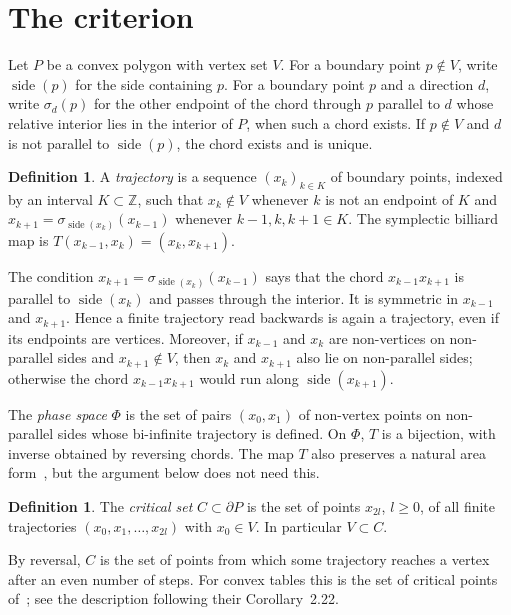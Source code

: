 \documentclass[11pt]{amsart}
\theoremstyle{definition}
\newtheorem{definition}[theorem]{Definition}
\theoremstyle{remark}
\newcommand{\Z}{\mathbb Z}
\newcommand{\side}{\operatorname{side}}
\begin{document}
\section{The criterion}\label{sec:criterion}

Let $P$ be a convex polygon with vertex set $V$. For a boundary point $p\notin V$, write $\side(p)$ for the side containing $p$. For a boundary point $p$ and a direction $d$, write $\sigma_d(p)$ for the other endpoint of the chord through $p$ parallel to $d$ whose relative interior lies in the interior of $P$, when such a chord exists. If $p\notin V$ and $d$ is not parallel to $\side(p)$, the chord exists and is unique.

\begin{definition}
A \emph{trajectory} is a sequence $(x_k)_{k\in K}$ of boundary points, indexed by an interval $K\subset\Z$, such that $x_k\notin V$ whenever $k$ is not an endpoint of $K$ and $x_{k+1}=\sigma_{\side(x_k)}(x_{k-1})$ whenever $k-1,k,k+1\in K$. The symplectic billiard map is $T(x_{k-1},x_k)=(x_k,x_{k+1})$.
\end{definition}

The condition $x_{k+1}=\sigma_{\side(x_k)}(x_{k-1})$ says that the chord $x_{k-1}x_{k+1}$ is parallel to $\side(x_k)$ and passes through the interior. It is symmetric in $x_{k-1}$ and $x_{k+1}$. Hence a finite trajectory read backwards is again a trajectory, even if its endpoints are vertices. Moreover, if $x_{k-1}$ and $x_k$ are non-vertices on non-parallel sides and $x_{k+1}\notin V$, then $x_k$ and $x_{k+1}$ also lie on non-parallel sides; otherwise the chord $x_{k-1}x_{k+1}$ would run along $\side(x_{k+1})$.

The \emph{phase space} $\Phi$ is the set of pairs $(x_0,x_1)$ of non-vertex points on non-parallel sides whose bi-infinite trajectory is defined. On $\Phi$, $T$ is a bijection, with inverse obtained by reversing chords. The map $T$ also preserves a natural area form~\cite[Lemma~2.1]{ABS25}, but the argument below does not need this.

\begin{definition}\label{def:C}
The \emph{critical set} $C\subset\partial P$ is the set of points $x_{2l}$, $l\ge0$, of all finite trajectories $(x_0,x_1,\dots,x_{2l})$ with $x_0\in V$. In particular $V\subset C$.
\end{definition}

By reversal, $C$ is the set of points from which some trajectory reaches a vertex after an even number of steps. For convex tables this is the set of critical points of~\cite{ALW26}; see the description following their Corollary~2.22.
\end{document}
